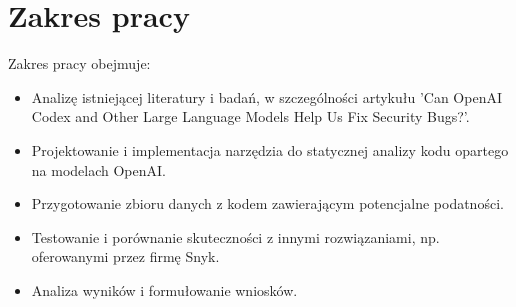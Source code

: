 \section*{Zakres pracy}
Zakres pracy obejmuje:
\begin{itemize}
    \item Analizę istniejącej literatury i badań, w szczególności artykułu 'Can OpenAI Codex and Other Large Language Models Help Us Fix Security Bugs?'.
    \item Projektowanie i implementacja narzędzia do statycznej analizy kodu opartego na modelach OpenAI.
    \item Przygotowanie zbioru danych z kodem zawierającym potencjalne podatności.
    \item Testowanie i porównanie skuteczności z innymi rozwiązaniami, np. oferowanymi przez firmę Snyk.
    \item Analiza wyników i formułowanie wniosków.
\end{itemize}